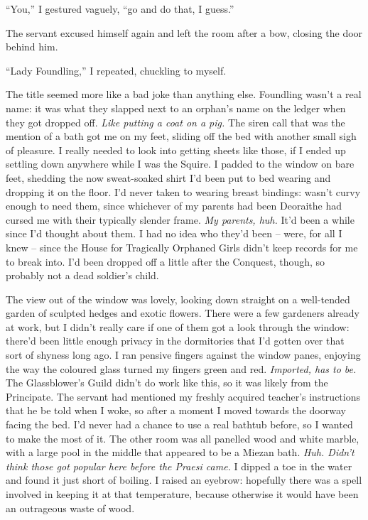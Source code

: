 \documentclass[12pt, openany]{book}
\begin{document}
“You,” I gestured vaguely, “go and do that, I guess.”

The servant excused himself again and left the room after a bow, closing the door behind him. 

“Lady Foundling,” I repeated, chuckling to myself.

The title seemed more like a bad joke than anything else. Foundling wasn’t a real name: it was what they slapped next to an orphan’s name on the ledger when they got dropped off. \textit{Like putting a coat on a pig.} The siren call that was the mention of a bath got me on my feet, sliding off the bed with another small sigh of pleasure. I really needed to look into getting sheets like those, if I ended up settling down anywhere while I was the Squire. I padded to the window on bare feet, shedding the now sweat-soaked shirt I’d been put to bed wearing and dropping it on the floor. I’d never taken to wearing breast bindings: wasn’t curvy enough to need them, since whichever of my parents had been Deoraithe had cursed me with their typically slender frame. \textit{My parents, huh. }It’d been a while since I’d thought about them. I had no idea who they’d been – were, for all I knew – since the House for Tragically Orphaned Girls didn’t keep records for me to break into. I’d been dropped off a little after the Conquest, though, so probably not a dead soldier’s child.

The view out of the window was lovely, looking down straight on a well-tended garden of sculpted hedges and exotic flowers. There were a few gardeners already at work, but I didn’t really care if one of them got a look through the window: there’d been little enough privacy in the dormitories that I’d gotten over that sort of shyness long ago. I ran pensive fingers against the window panes, enjoying the way the coloured glass turned my fingers green and red. \textit{Imported, has to be.} The Glassblower’s Guild didn’t do work like this, so it was likely from the Principate. The servant had mentioned my freshly acquired teacher’s instructions that he be told when I woke, so after a moment I moved towards the doorway facing the bed. I’d never had a chance to use a real bathtub before, so I wanted to make the most of it. The other room was all panelled wood and white marble, with a large pool in the middle that appeared to be a Miezan bath. \textit{Huh. Didn’t think those got popular here before the Praesi came.} I dipped a toe in the water and found it just short of boiling. I raised an eyebrow: hopefully there was a spell involved in keeping it at that temperature, because otherwise it would have been an outrageous waste of wood.
\end{document}
